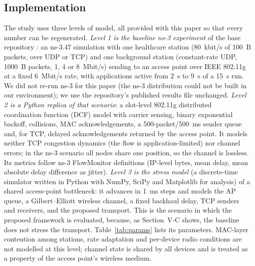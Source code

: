 \documentclass[10pt,twocolumn,letterpaper]{article}
\begin{document}
\subsection{Implementation}
The study uses three levels of model, all provided with this paper so that every number can be regenerated.
\emph{Level 1 is the baseline ns-3 experiment} of the base repository \cite{repo}: an ns-3.47 \cite{ns3} simulation with one healthcare station (80~kbit/s of 100~B packets, over UDP or TCP) and one background station (constant-rate UDP, 1000~B packets, 1, 4 or 8~Mbit/s) sending to an access point over IEEE 802.11g at a fixed 6~Mbit/s rate, with applications active from 2~s to 9~s of a 15~s run. We did not re-run ns-3 for this paper (the ns-3 distribution could not be built in our environment); we use the repository's published results file unchanged.
\emph{Level 2 is a Python replica of that scenario}: a slot-level 802.11g distributed coordination function (DCF) model with carrier sensing, binary exponential backoff, collisions, MAC acknowledgements, a 500-packet/500~ms sender queue and, for TCP, delayed acknowledgements returned by the access point. It models neither TCP congestion dynamics (the flow is application-limited) nor channel errors; in the ns-3 scenario all nodes share one position, so the channel is lossless. Its metrics follow ns-3 FlowMonitor definitions (IP-level bytes, mean delay, mean absolute delay difference as jitter).
\emph{Level 3 is the stress model} (a discrete-time simulator written in Python with NumPy, SciPy and Matplotlib for analysis) of a shared access-point bottleneck: it advances in 1~ms steps and models the AP queue, a Gilbert--Elliott wireless channel, a fixed backhaul delay, TCP senders and receivers, and the proposed transport. This is the scenario in which the proposed framework is evaluated, because, as Section~V-C shows, the baseline does not stress the transport. Table~\ref{tab:params} lists its parameters. MAC-layer contention among stations, rate adaptation and per-device radio conditions are not modelled at this level; channel state is shared by all devices and is treated as a property of the access point's wireless medium.
\end{document}
